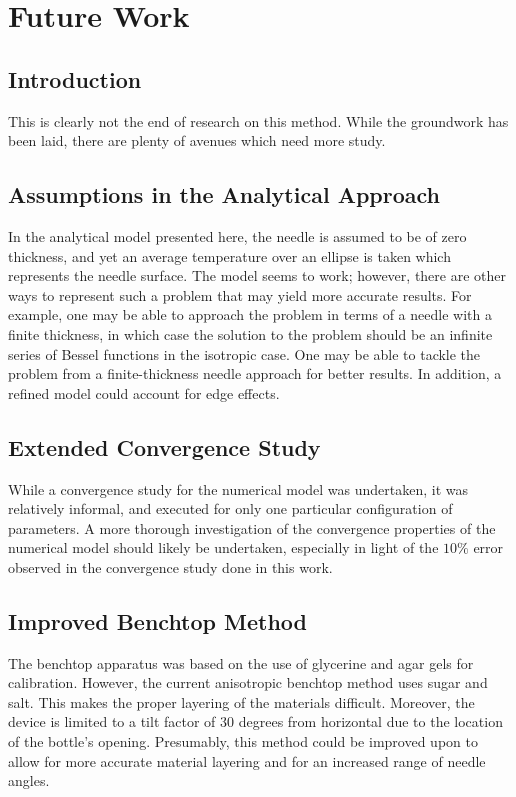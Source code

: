\chapter{Future Work}

\section{Introduction}

This is clearly not the end of research on this method. While the groundwork has
been laid, there are plenty of avenues which need more study.

\section{Assumptions in the Analytical Approach}

In the analytical model presented here, the needle is assumed to be of zero
thickness, and yet an average temperature over an ellipse is taken which
represents the needle surface.  The model seems to work; however, there are
other ways to represent such a problem that may yield more accurate results. For
example, one may be able to approach the problem in terms of a needle with a
finite thickness, in which case the solution to the problem should be an
infinite series of Bessel functions in the isotropic case. One may be able to
tackle the problem from a finite-thickness needle approach for better results. In addition, a refined model could account for edge effects. \cite{axialerror}

\section{Extended Convergence Study}

While a convergence study for the numerical model was undertaken, it was relatively
informal, and executed for only one particular configuration of parameters. A
more thorough investigation of the convergence properties of the numerical model
should likely be undertaken, especially in light of the \(10\%\) error observed
in the convergence study done in this work.

\section{Improved Benchtop Method}

The benchtop apparatus was based on the use of glycerine and agar gels for
calibration. However, the current anisotropic benchtop method uses sugar and
salt. This makes the proper layering of the materials difficult. Moreover, the
device is limited to a tilt factor of \(30\) degrees from horizontal due to the
location of the bottle's opening. Presumably, this method could be improved upon
to allow for more accurate material layering and for an increased range of
needle angles.

